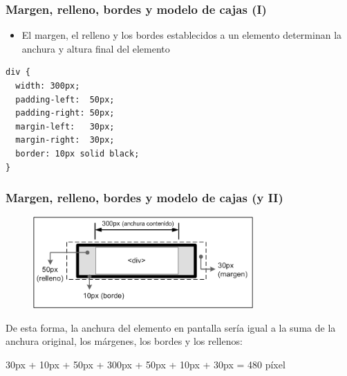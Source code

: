 
\begin{frame}[fragile]
\frametitle{Margen, relleno, bordes y modelo de cajas (I)}

\begin{itemize}
  \item El margen, el relleno y los bordes establecidos a un elemento determinan la anchura y altura final del elemento
\end{itemize}

{\footnotesize
\begin{verbatim}
div {
  width: 300px;
  padding-left:  50px;
  padding-right: 50px;
  margin-left:   30px;
  margin-right:  30px;
  border: 10px solid black;
}
\end{verbatim}
}



\end{frame}


\begin{frame}[fragile]
\frametitle{Margen, relleno, bordes y modelo de cajas (y II)}

\begin{center}
\begin{figure}[p]
\includegraphics[width=0.75\textwidth]{figs/f0414.png}
\end{figure}
\end{center}

De esta forma, la anchura del elemento en pantalla sería igual a la suma de la anchura original, los márgenes, los bordes y los rellenos:

30px + 10px + 50px + 300px + 50px + 10px + 30px = 480 píxel

\end{frame}


